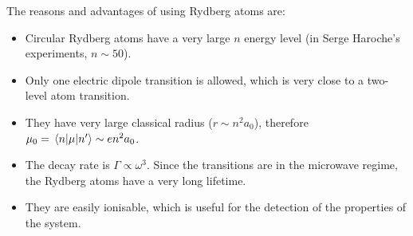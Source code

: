 The reasons and advantages of using Rydberg atoms are:
\begin{itemize}
	\item Circular Rydberg atoms have a very large $n$ energy level (in Serge Haroche's experiments, $n \sim 50$).
	\item Only one electric dipole transition is allowed, which is very close to a two-level atom transition.
	\item They have very large classical radius ($r \sim n^{2} a_{0}$), therefore $\mu_{0} = \mel{n}{\mu}{n'} \sim e n^{2} a_{0}$.
	\item The decay rate is $\Gamma \propto \omega^{3}$. Since the transitions are in the microwave regime, the Rydberg atoms have a very long lifetime.
	\item They are easily ionisable, which is useful for the detection of the properties of the system.
\end{itemize}
